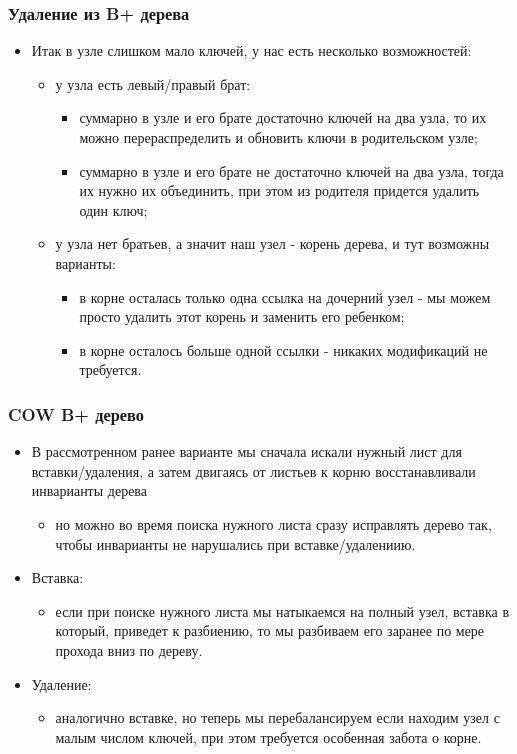 \begin{frame}
\frametitle{Удаление из B+ дерева}
\begin{itemize}
  \item Итак в узле слишком мало ключей, у нас есть несколько возможностей:
  \begin{itemize}
    \item у узла есть левый/правый брат:
    \begin{itemize}
      \item суммарно в узле и его брате достаточно ключей на два узла, то
      их можно перераспределить и обновить ключи в родительском узле;
      \item суммарно в узле и его брате не достаточно ключей на два узла,
      тогда их нужно их объединить, при этом из родителя придется удалить
      один ключ;
    \end{itemize}
    \item у узла нет братьев, а значит наш узел - корень дерева, и тут
    возможны варианты:
    \begin{itemize}
      \item в корне осталась только одна ссылка на дочерний узел - мы можем
      просто удалить этот корень и заменить его ребенком;
      \item в корне осталось больше одной ссылки - никаких модификаций не
      требуется.
    \end{itemize}
  \end{itemize}
\end{itemize}
\end{frame}

\begin{frame}
\frametitle{COW B+ дерево}
\begin{itemize}
  \item В рассмотренном ранее варианте мы сначала искали нужный лист для
  вставки/удаления, а затем двигаясь от листьев к корню восстанавливали
  инварианты дерева
  \begin{itemize}
    \item но можно во время поиска нужного листа сразу исправлять дерево
    так, чтобы инварианты не нарушались при вставке/удалениию.
  \end{itemize}
  \item Вставка:
  \begin{itemize}
    \item если при поиске нужного листа мы натыкаемся на полный узел,
    вставка в который, приведет к разбиению, то мы разбиваем его заранее
    по мере прохода вниз по дереву.
  \end{itemize}
  \item Удаление:
  \begin{itemize}
    \item аналогично вставке, но теперь мы перебалансируем если находим
    узел с малым числом ключей, при этом требуется особенная забота о
    корне.
  \end{itemize}
\end{itemize}
\end{frame}

